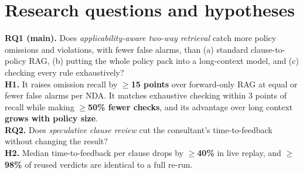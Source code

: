 \documentclass[11pt,a4paper]{article}
\begin{document}
\section{Research questions and hypotheses}
\begin{keybox}
\textbf{RQ1 (main).} Does \emph{applicability-aware two-way retrieval} catch more policy omissions and violations, with fewer false alarms, than (a) standard clause-to-policy RAG, (b) putting the whole policy pack into a long-context model, and (c) checking every rule exhaustively?\\[2pt]
\textbf{H1.} It raises omission recall by \textbf{$\geq$15 points} over forward-only RAG at equal or fewer false alarms per NDA. It matches exhaustive checking within 3 points of recall while making \textbf{$\geq$50\% fewer checks}, and its advantage over long context \textbf{grows with policy size}.\\[4pt]
\textbf{RQ2.} Does \emph{speculative clause review} cut the consultant's time-to-feedback without changing the result?\\[2pt]
\textbf{H2.} Median time-to-feedback per clause drops by \textbf{$\geq$40\%} in live replay, and \textbf{$\geq$98\%} of reused verdicts are identical to a full re-run.
\end{keybox}

\end{document}
